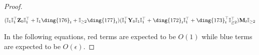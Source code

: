 \documentclass{article}
\theoremstyle{plain}
\theoremstyle{remark}
\def\bY{\mathbf{Y}}
\def\bZ{\mathbf{Z}}
\newcommand{\cc}[1]{\text{\ding{\number\numexpr#1 + 171\relax}}}
\begin{document}
\begin{proof}
\begin{align*}
            (\mathbb{I}_{1}\mathbb{I}_{1}^\top\bZ_0\mathbb{I}_1^\top+\mathbb{I}_{1}\cc{5}_t+\mathbb{I}_{\ge2}\cc{6}_t)
            (\mathbb{I}_{1}^\top\bY_0\mathbb{I}_{1}\mathbb{I}_1^\top+\cc{1}_t\mathbb{I}_{1}^\top+\cc{2}_t^\top\mathbb{I}_{\ge2}^\top)\mathbf{M}_{t}\mathbb{I}_{\ge 2}
        \\
    \end{align*}

    In the following equations, {\color{red}red} terms are expected to be $O(1)$ while {\color{blue}blue} terms are expected to be $O(\epsilon)$.


\end{proof}
\end{document}
